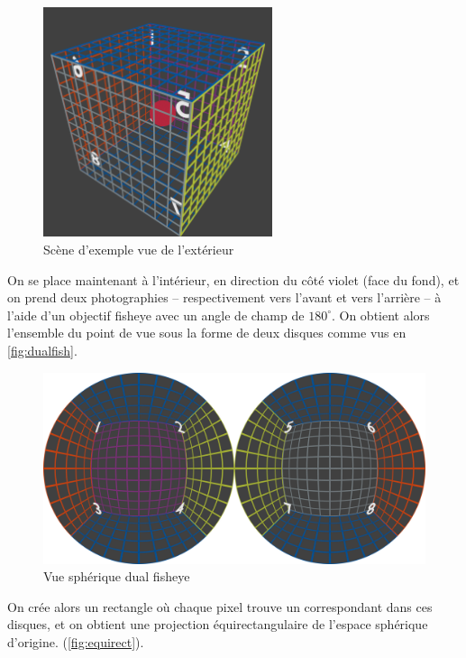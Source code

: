 			\begin{figure}[H]
			{
				\centering
				\includegraphics[width=0.6\textwidth]{figures/cage.png}
				\caption{Scène d'exemple vue de l'extérieur}
				\label{fig:cage}
			}
			\end{figure}
			\par
			On se place maintenant à l'intérieur, en direction du côté violet (face du fond), et on prend deux photographies -- respectivement vers l'avant et vers l'arrière -- à l'aide d'un objectif \gls{fisheye} avec un angle de champ de $180^{\circ}$. On obtient alors l'ensemble du point de vue sous la forme de deux disques comme vus en \autoref{fig:dualfish}.
			\begin{figure}[H]
			{
				\centering
				\includegraphics[width=1\textwidth]{figures/dfish.png}
				\caption{Vue sphérique \og dual fisheye \fg{}}
				\label{fig:dualfish}
			}
			\end{figure}
			\par
			On crée alors un rectangle où chaque pixel trouve un correspondant dans ces disques, et on obtient une projection équirectangulaire de l'espace sphérique d'origine. (\autoref{fig:equirect}).
